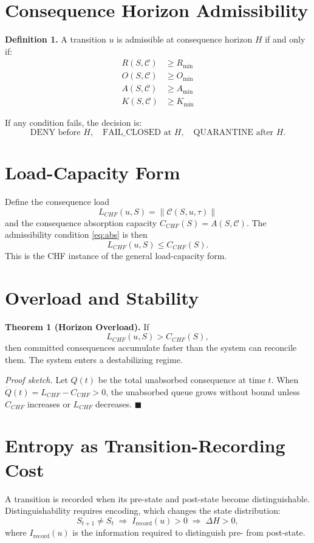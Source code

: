 \documentclass[letterpaper,10pt,conference]{ieeeconf}
\newcommand{\Cf}{\mathcal{C}}
\newcommand{\Rec}{R}
\newcommand{\Obs}{O}
\newcommand{\Abs}{A}
\newcommand{\Koh}{K}
\begin{document}
\section{Consequence Horizon Admissibility}

\textbf{Definition 1.} A transition $u$ is admissible at consequence horizon $H$ if and only if:
\begin{align}
\Rec(S,\Cf) &\ge R_{\min} \label{eq:rec}\\
\Obs(S,\Cf) &\ge O_{\min} \label{eq:obs}\\
\Abs(S,\Cf) &\ge A_{\min} \label{eq:abs}\\
\Koh(S,\Cf) &\ge K_{\min} \label{eq:koh}
\end{align}

If any condition fails, the decision is:
\[
\text{DENY before } H, \quad \text{FAIL\_CLOSED at } H, \quad \text{QUARANTINE after } H.
\]

\section{Load-Capacity Form}

Define the consequence load
\[
L_{CHF}(u, S) = \|\Cf(S, u, \tau)\|
\]
and the consequence absorption capacity $C_{CHF}(S) = \Abs(S, \Cf)$. The admissibility condition \eqref{eq:abs} is then
\[
L_{CHF}(u, S) \le C_{CHF}(S).
\]
This is the CHF instance of the general load-capacity form.

\section{Overload and Stability}

\textbf{Theorem 1 (Horizon Overload).} If
\[
L_{CHF}(u, S) > C_{CHF}(S),
\]
then committed consequences accumulate faster than the system can reconcile them. The system enters a destabilizing regime.

\textit{Proof sketch.} Let $Q(t)$ be the total unabsorbed consequence at time $t$. When $\dot Q(t) = L_{CHF} - C_{CHF} > 0$, the unabsorbed queue grows without bound unless $C_{CHF}$ increases or $L_{CHF}$ decreases. \hfill $\blacksquare$

\section{Entropy as Transition-Recording Cost}

A transition is recorded when its pre-state and post-state become distinguishable. Distinguishability requires encoding, which changes the state distribution:
\[
S_{t+1} \ne S_t \;\Rightarrow\; I_{\text{record}}(u) > 0 \;\Rightarrow\; \Delta H > 0,
\]
where $I_{\text{record}}(u)$ is the information required to distinguish pre- from post-state.
\end{document}
